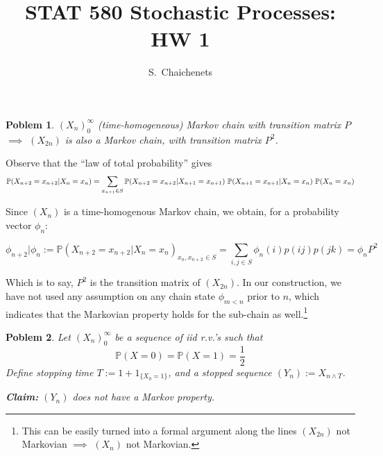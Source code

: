 \documentclass[8pt,notitlepage]{report}
\newtheorem{problem}{Poblem}
\newenvironment{solution}[1][Solution]{\begin{trivlist}
    \item[\hskip \labelsep {\bfseries #1}]}{\end{trivlist}}
\newcommand{\PP}{\mathbb{P}}
\begin{document}
\title{STAT 580 Stochastic Processes: HW 1}
\author{ S.\ Chaichenets }
\maketitle



\begin{problem}
	$(X_n)_0^\infty$ (time-homogeneous) Markov chain with transition matrix $P$  $\implies$
	$(X_{2n})$ is also a Markov chain, with transition matrix $P^2$.
\end{problem}

\begin{solution}

Observe that the ``law of total probability'' gives
\begin{equation}
\small
\PP(X_{n+2}=x_{n+2}|X_{n}=x_{n})
	=  
\sum_{x_{n+1} \in S} \PP(X_{n+2}=x_{n+2}|X_{n+1}=x_{n+1}) \ \PP(X_{n+1}=x_{n+1}|X_{n}=x_{n}) \ \PP(X_{n}=x_{n})
\end{equation}
\normalsize

Since $(X_n)$ is a time-homogenous Markov chain, we obtain, for a probability vector $\phi_n$:

\begin{equation}
\phi_{n+2} | \phi_{n} := 
\PP(X_{n+2}=x_{n+2}|X_{n}=x_{n})_{x_n,x_{n+2} \in S}
	= 
	\sum_{i,j \in S} \phi_n(i) p(ij) p(jk)
	= \phi_n P^2
\end{equation}

Which is to say, $P^2$ is the transition matrix of $(X_{2n})$. In our construction, 
we have not used any assumption on any chain state $\phi_{m < n}$ prior to $n$,
which indicates that the Markovian property holds for the sub-chain as well.\footnote{This can be easily turned into a formal argument along the lines $(X_{2n})$ not Markovian $\implies$ $(X_n)$ not Markovian.}

\end{solution}


\begin{problem}
  Let $(X_n)_0^\infty$ be a sequence of iid r.v.'s such that $$ \PP(X=0) = \PP(X=1) = \frac{1}{2} $$
  Define stopping time $ T := 1 + 1_{\{X_0 = 1\} } $, and a stopped sequence $ (Y_n) := X_{n \wedge T} $.

  {\bf Claim:} $(Y_n)$ does not have a Markov property.
\end{problem}
\end{document}
